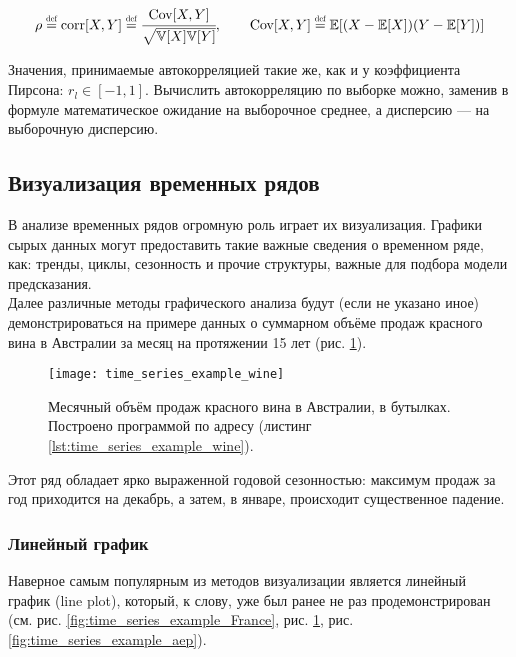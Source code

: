 \begin{equation*}
    \rho \defeq \text{corr}[X, Y] \defeq 
    \cfrac{\text{Cov}[X, Y]}{\sqrt{\mathbb{V}[X]\mathbb{V}[Y]}}, \qquad 
    \text{Cov}[X, Y] \defeq \mathbb{E}[(X - \mathbb{E}[X])(Y - \mathbb{E}[Y])]
\end{equation*}

Значения, принимаемые автокорреляцией такие же, как и у коэффициента 
Пирсона: $r_l \in [-1, 1]$. Вычислить автокорреляцию по выборке можно, заменив в формуле 
математическое ожидание на выборочное среднее, а дисперсию — на выборочную дисперсию.

\subsection{Визуализация временных рядов}

В анализе временных рядов огромную роль играет их визуализация. 
Графики \guillemotleft сырых\guillemotright {} данных могут предоставить такие 
важные сведения о временном ряде, как: тренды, циклы, сезонность и прочие структуры, 
важные для подбора модели предсказания. \\

Далее различные методы графического анализа будут (если не указано иное) 
демонстрироваться 
на примере данных о суммарном объёме продаж красного вина в Австралии за
месяц на протяжении 15 лет (рис. \ref{fig:time_series_wine}).

\begin{figure}[h!]
    \centering
    \texttt{[image: time\_series\_example\_wine]}
    \caption{Месячный объём продаж красного вина в Австралии, в бутылках. 
    Построено программой по адресу (листинг \ref{lst:time_series_example_wine}).}
    \label{fig:time_series_wine}
\end{figure}

Этот ряд обладает ярко выраженной годовой сезонностью: максимум продаж за год 
приходится на декабрь, а затем, в январе, происходит существенное падение.

\subsubsection{Линейный график}

Наверное самым популярным из методов визуализации является линейный график (line plot), 
который, к слову, уже был ранее не раз продемонстрирован 
(см. рис. \ref{fig:time_series_example_France}, рис. \ref{fig:time_series_wine}, 
рис. \ref{fig:time_series_example_aep}). \\

